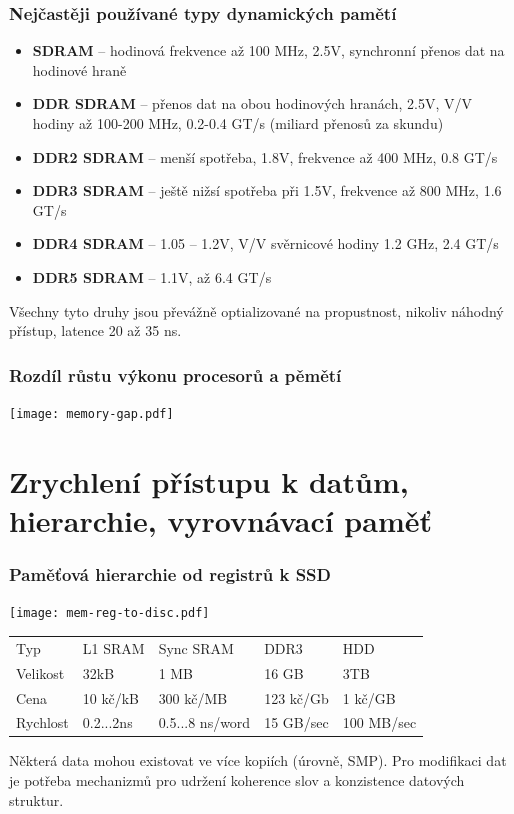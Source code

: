 \documentclass{beamer}
\begin{document}
\begin{frame}
\frametitle{Nejčastěji používané typy dynamických pamětí}

\begin{itemize}
\item \textbf{SDRAM} -- hodinová frekvence až 100 MHz, 2.5V, synchronní přenos dat na hodinové hraně
\item \textbf{DDR SDRAM} -- přenos dat na obou hodinových hranách, 2.5V, V/V hodiny až 100-200 MHz, 0.2-0.4 GT/s (miliard přenosů za skundu)
\item \textbf{DDR2 SDRAM} -- menší spotřeba, 1.8V, frekvence až 400 MHz, 0.8 GT/s
\item \textbf{DDR3 SDRAM} -- ještě nižsí spotřeba při 1.5V, frekvence až 800 MHz, 1.6 GT/s
\item \textbf{DDR4 SDRAM} -- 1.05 -- 1.2V,  V/V svěrnicové hodiny 1.2 GHz, 2.4 GT/s
\item \textbf{DDR5 SDRAM} -- 1.1V, až 6.4 GT/s
\end{itemize}

Všechny tyto druhy jsou převážně optializované na propustnost, nikoliv náhodný přístup, latence 20 až 35 ns.

\end{frame}


\begin{frame}
\frametitle{Rozdíl růstu výkonu procesorů a pěmětí}

\centering

\texttt{[image: memory-gap.pdf]}

\end{frame}

\section{Zrychlení přístupu k datům, hierarchie, vyrovnávací paměť}

\begin{frame}
\frametitle{Paměťová hierarchie od registrů k SSD}

{
\centering

\texttt{[image: mem-reg-to-disc.pdf]}

}
\vskip 2mm

\begin{tabular}{l|llll}
Typ      & L1 SRAM   & Sync SRAM &  DDR3      & HDD \\
Velikost & 32kB      & 1 MB      &  16 GB     & 3TB \\
Cena     & 10 kč/kB  & 300 kč/MB &  123 kč/Gb & 1 kč/GB \\
Rychlost & 0.2...2ns & 0.5...8 ns/word & 15 GB/sec & 100 MB/sec \\
\end{tabular}

\vskip 2mm

Některá data mohou existovat ve více kopiích (úrovně, SMP).
Pro modifikaci dat je potřeba mechanizmů pro udržení koherence slov a konzistence datových struktur.

\end{frame}
\end{document}
